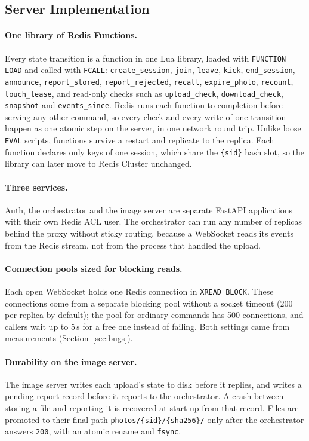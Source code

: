 \subsection{Server Implementation}

\paragraph{One library of Redis Functions.} Every state transition is a function in one Lua library, loaded with \texttt{FUNCTION LOAD} and called with \texttt{FCALL}: \texttt{create\_session}, \texttt{join}, \texttt{leave}, \texttt{kick}, \texttt{end\_session}, \texttt{announce}, \texttt{report\_stored}, \texttt{report\_rejected}, \texttt{recall}, \texttt{expire\_photo}, \texttt{recount}, \texttt{touch\_lease}, and read-only checks such as \texttt{upload\_check}, \texttt{download\_check}, \texttt{snapshot} and \texttt{events\_since}. Redis runs each function to completion before serving any other command, so every check and every write of one transition happen as one atomic step on the server, in one network round trip. Unlike loose \texttt{EVAL} scripts, functions survive a restart and replicate to the replica. Each function declares only keys of one session, which share the \texttt{\{sid\}} hash slot, so the library can later move to Redis Cluster unchanged.

\paragraph{Three services.} Auth, the orchestrator and the image server are separate FastAPI applications with their own Redis ACL user. The orchestrator can run any number of replicas behind the proxy without sticky routing, because a WebSocket reads its events from the Redis stream, not from the process that handled the upload.

\paragraph{Connection pools sized for blocking reads.} Each open WebSocket holds one Redis connection in \texttt{XREAD BLOCK}. These connections come from a separate blocking pool without a socket timeout (200 per replica by default); the pool for ordinary commands has 500 connections, and callers wait up to 5\,s for a free one instead of failing. Both settings came from measurements (Section~\ref{sec:bugs}).

\paragraph{Durability on the image server.} The image server writes each upload's state to disk before it replies, and writes a pending-report record before it reports to the orchestrator. A crash between storing a file and reporting it is recovered at start-up from that record. Files are promoted to their final path \texttt{photos/\{sid\}/\{sha256\}/} only after the orchestrator answers \texttt{200}, with an atomic rename and \texttt{fsync}.


